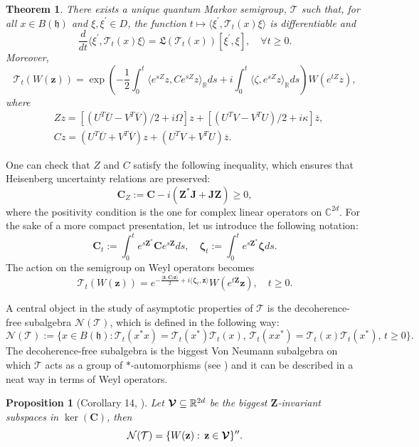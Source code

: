 \documentclass[preprint]{elsarticle}
\newtheorem{prop}[defi]{Proposition}
\newtheorem{theo}[defi]{Theorem}
\theoremstyle{definition}
\def\hh{\mathfrak{h} }
\def\CC{\mathbb{C}}
\def\RR{\mathbb{R}}
\def\TT{\mathcal{T}}
\def\NN{\mathcal{N}(\TT)}
\def\hh{\mathfrak{h}}
\begin{document}
\begin{theo}
There exists a unique quantum Markov semigroup, $\TT$ such that, for all $x \in B(\hh)$ and $\xi, \xi^\prime \in D$, the function $t \mapsto \langle \xi^\prime, \TT_t(x) \xi \rangle$ is differentiable and
$$
\frac{d}{dt} \langle \xi^\prime, \TT_t(x) \xi \rangle = \mathfrak{L}(\TT_t(x))[\xi^\prime,\xi], \quad  \forall t \geq 0.
$$
Moreover,
\begin{equation} \label{eq:aW}
\TT_t(W(\mathbf{z}))=\exp\left (-\frac{1}{2}\int_0^t \langle e^{sZ}z,Ce^{sZ}z \rangle_\RR ds + i \int_0^t \langle \zeta,e^{sZ}z \rangle_\RR ds\right )W(e^{tZ}z),
\end{equation}
where 
\begin{align}
&Zz=[(U^T\overline{U}-V^T\overline{V})/2+i \Omega]z+ [(U^TV-V^TU)/2+i \kappa]\overline{z},\label{eq:Z}\\
&Cz=(U^T\overline{U}+V^T\overline{V})z + (U^TV+V^TU)\overline{z} \label{eq:C}.
\end{align}
\end{theo}
One can check that $Z$ and $C$ satisfy the following inequality, which ensures that Heisenberg uncertainty relations are preserved:
$$\mathbf{C}_{Z}:=\mathbf{C}-i(\mathbf{Z}^*\mathbf{J}+\mathbf{J}\mathbf{Z}) \geq 0,$$
where the positivity condition is the one for complex linear operators on $\CC^{2d}$. For the sake of a more compact presentation, let us introduce the following notation:
$$\mathbf{C}_t:=\int_0^{t} e^{s\mathbf{Z}^*}\mathbf{C}e^{s\mathbf{Z}} ds, \quad \boldsymbol{\zeta}_t:=\int_0^te^{s\mathbf{Z}^*}\boldsymbol{\zeta}ds.$$
The action on the semigroup on Weyl operators becomes
$$\TT_t(W(\mathbf{z}))=e^{-\frac{\langle \mathbf{z},\mathbf{C}_t\mathbf{z}\rangle}{2}+i\langle\boldsymbol{\zeta}_t, \mathbf{z}\rangle}W(e^{t\mathbf{Z}}\mathbf{z}), \quad t \geq 0.$$

A central object in the study of asymptotic properties of $\TT$ is the decoherence-free subalgebra $\NN$, which is defined in the following way:
$$\NN:=\{x \in B(\hh):\TT_t(x^*x)=\TT_t(x^*)\TT_t(x), \, \TT_t(xx^*)=\TT_t(x)\TT_t(x^*), \, t \geq 0\}.$$
The decoherence-free subalgebra is the biggest Von Neumann subalgebra on which $\TT$ acts as a group of $*$-automorphisms (see \cite[Proposition 3]{GP26}) and it can be described in a neat way in terms of Weyl operators.

\begin{prop}[Corollary 14, \cite{AFP22}] \label{prop:decofree}
Let $\boldsymbol{{\cal V}}\subseteq \RR^{2d}$ be the biggest $\mathbf{Z}$-invariant subspaces in $\ker(\mathbf{C})$, then
$$\NN=\{W(\mathbf{z}):\, \mathbf{z} \in \boldsymbol{{\cal V}}\}^{\prime \prime}.$$  
\end{prop}
\end{document}
